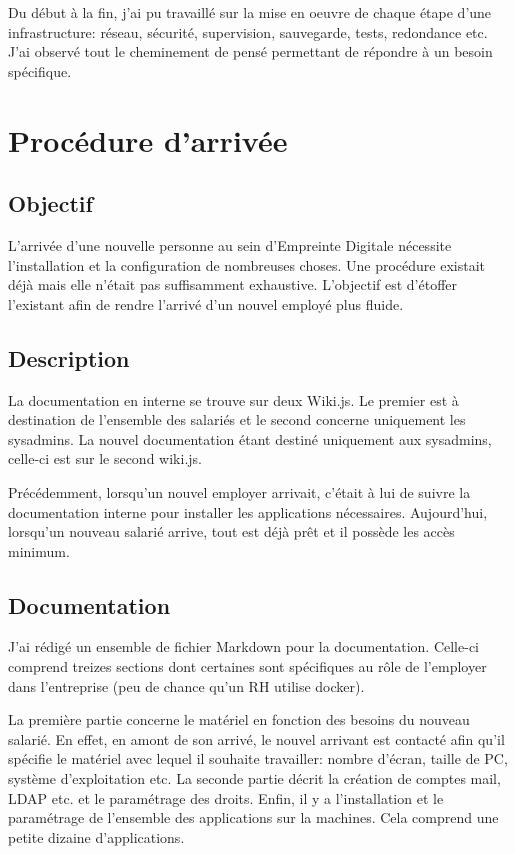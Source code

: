 \documentclass[12pt]{article}
\begin{document}
Du début à la fin, j'ai pu travaillé sur la mise en oeuvre de chaque étape d'une infrastructure: réseau, sécurité, supervision, sauvegarde, tests, redondance etc.
J'ai observé tout le cheminement de pensé permettant de répondre à un besoin spécifique.



\newpage
\section{Procédure d'arrivée}
\subsection{Objectif}
L'arrivée d'une nouvelle personne au sein d'Empreinte Digitale nécessite l'installation et la configuration de nombreuses choses.
Une procédure existait déjà mais elle n'était pas suffisamment exhaustive.
L'objectif est d'étoffer l'existant afin de rendre l'arrivé d'un nouvel employé plus fluide.

\subsection{Description}
La documentation en interne se trouve sur deux Wiki.js.
Le premier est à destination de l'ensemble des salariés et le second concerne uniquement les sysadmins.
La nouvel documentation étant destiné uniquement aux sysadmins, celle-ci est sur le second wiki.js.

Précédemment, lorsqu'un nouvel employer arrivait, c'était à lui de suivre la documentation interne pour installer les applications nécessaires.
Aujourd'hui, lorsqu'un nouveau salarié arrive, tout est déjà prêt et il possède les accès minimum. 

\subsection{Documentation}
J'ai rédigé un ensemble de fichier \gls{Markdown} pour la documentation. 
Celle-ci comprend treizes sections dont certaines sont spécifiques au rôle de l'employer dans l'entreprise (peu de chance qu'un RH utilise docker).

La première partie concerne le matériel en fonction des besoins du nouveau salarié.
En effet, en amont de son arrivé, le nouvel arrivant est contacté afin qu'il spécifie le matériel avec lequel il souhaite travailler: nombre d'écran, taille de PC, système d'exploitation etc.
La seconde partie décrit la création de comptes mail, \gls{LDAP} etc. et le paramétrage des droits.
Enfin, il y a l'installation et le paramétrage de l'ensemble des applications sur la machines.
Cela comprend une petite dizaine d'applications.
\end{document}
